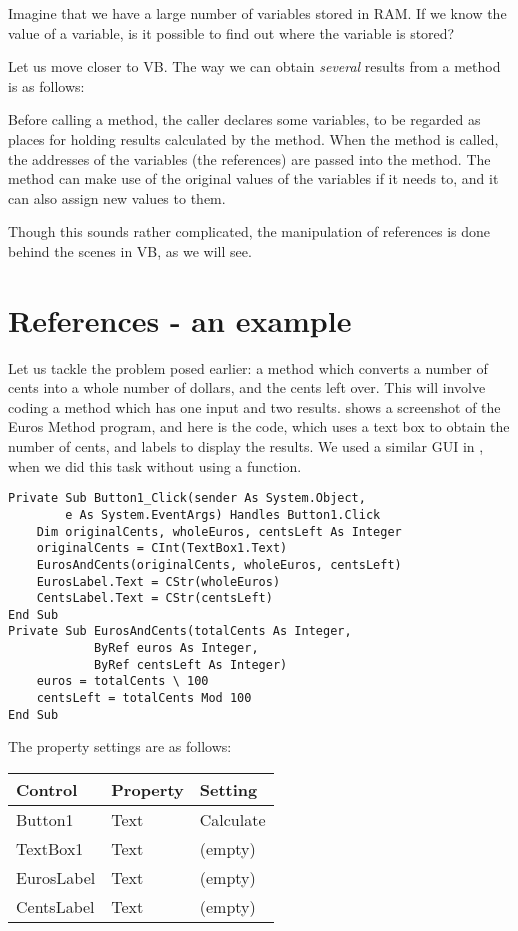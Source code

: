 		\begin{stqb}
			\begin{STQ}
				\item	Imagine that we have a large number of variables stored in RAM. If we know the value of a variable, is it possible to find out where the variable is stored?
			\end{STQ}
		\end{stqb}
		Let us move closer to VB. The way we can obtain \emph{several} results from a method is as follows:

		Before calling a method, the caller declares some variables, to be regarded as places for holding results calculated by the method. When the method is called, the addresses of the variables (the references) are passed into the method. The method can make use of the original values of the variables if it needs to, and it can also assign new values to them.
		
		Though this sounds rather complicated, the manipulation of references is done behind the scenes in VB, as we will see.


	\section{References - an example}
	Let us tackle the problem posed earlier: a method which converts a number of cents into a whole number of dollars, and the cents left over. This will involve coding a method which has one input and two results.  shows a screenshot of the Euros Method program, and here is the code, which uses a text box to obtain the number of cents, and labels to display the results. We used a similar GUI in , when we did this task without using a function.
		\begin{lstlisting}
Private Sub Button1_Click(sender As System.Object,
		e As System.EventArgs) Handles Button1.Click
	Dim originalCents, wholeEuros, centsLeft As Integer
	originalCents = CInt(TextBox1.Text)
	EurosAndCents(originalCents, wholeEuros, centsLeft)
	EurosLabel.Text = CStr(wholeEuros)
	CentsLabel.Text = CStr(centsLeft)
End Sub
Private Sub EurosAndCents(totalCents As Integer,
			ByRef euros As Integer,
			ByRef centsLeft As Integer)
	euros = totalCents \ 100
	centsLeft = totalCents Mod 100
End Sub
		\end{lstlisting}
		The property settings are as follows:
		\begin{center}
			\begin{tabular}{lll}
				\toprule Control &	Property	 & Setting \\ \midrule
				Button1 & Text & Calculate\\
				TextBox1 & Text & (empty)\\
				EurosLabel & Text & (empty)\\
				CentsLabel & Text & (empty) \\ \bottomrule
			\end{tabular}
		\end{center}

